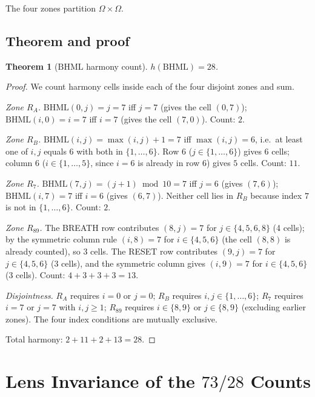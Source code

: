 \documentclass[11pt,reqno]{amsart}
\theoremstyle{plain}
\newtheorem{theorem}{Theorem}
\theoremstyle{definition}
\theoremstyle{remark}
\newcommand{\BHML}{\mathrm{BHML}}
\begin{document}
The four zones partition $\Omega \times \Omega$.

\subsection{Theorem and proof}

\begin{theorem}[$\BHML$ harmony count]\label{thm:bhml}
$h(\BHML) = 28$.
\end{theorem}

\begin{proof}
We count harmony cells inside each of the four disjoint zones and
sum.

\emph{Zone $R_A$.} $\BHML(0, j) = j = 7$ iff $j = 7$ (gives the
cell $(0, 7)$); $\BHML(i, 0) = i = 7$ iff $i = 7$ (gives the cell
$(7, 0)$). Count: $2$.

\emph{Zone $R_B$.} $\BHML(i, j) = \max(i, j) + 1 = 7$ iff
$\max(i, j) = 6$, i.e.\ at least one of $i, j$ equals $6$ with both
in $\{1, \ldots, 6\}$. Row $6$ ($j \in \{1, \ldots, 6\}$) gives
$6$ cells; column $6$ ($i \in \{1, \ldots, 5\}$, since $i = 6$ is
already in row $6$) gives $5$ cells. Count: $11$.

\emph{Zone $R_7$.} $\BHML(7, j) = (j + 1) \bmod 10 = 7$ iff
$j = 6$ (gives $(7, 6)$); $\BHML(i, 7) = 7$ iff $i = 6$ (gives
$(6, 7)$). Neither cell lies in $R_B$ because index $7$ is not in
$\{1, \ldots, 6\}$. Count: $2$.

\emph{Zone $R_{89}$.} The BREATH row contributes
$(8, j) = 7$ for $j \in \{4, 5, 6, 8\}$ (4 cells); by the symmetric
column rule $(i, 8) = 7$ for $i \in \{4, 5, 6\}$ (the cell
$(8, 8)$ is already counted), so 3 cells. The RESET row
contributes $(9, j) = 7$ for $j \in \{4, 5, 6\}$ (3 cells), and the
symmetric column gives $(i, 9) = 7$ for $i \in \{4, 5, 6\}$
(3 cells). Count: $4 + 3 + 3 + 3 = 13$.

\emph{Disjointness.} $R_A$ requires $i = 0$ or $j = 0$; $R_B$
requires $i, j \in \{1, \ldots, 6\}$; $R_7$ requires $i = 7$ or
$j = 7$ with $i, j \ge 1$; $R_{89}$ requires $i \in \{8, 9\}$ or
$j \in \{8, 9\}$ (excluding earlier zones). The four index
conditions are mutually exclusive.

Total harmony: $2 + 11 + 2 + 13 = 28$.
\end{proof}

\section{Lens Invariance of the $73/28$ Counts}\label{sec:lens}
\end{document}
